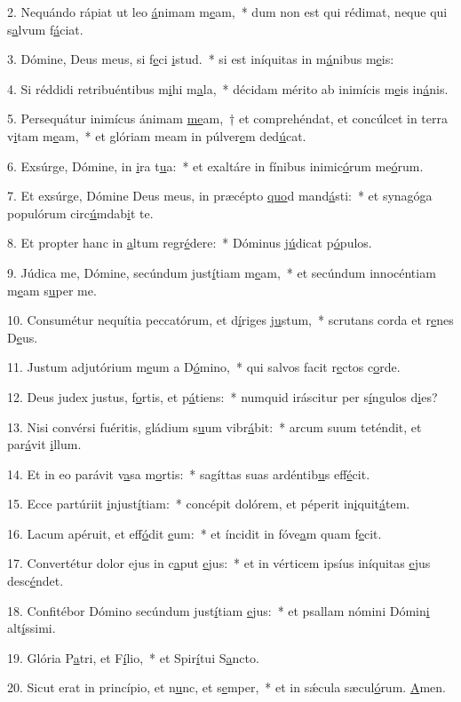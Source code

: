 2. Nequándo rápiat ut leo \uline{á}nimam m\uline{e}am,~* dum non est qui rédimat, neque qui s\uline{a}lvum f\uline{á}ciat.\par 
3. Dómine, Deus meus, si f\uline{e}ci \uline{i}stud.~* si est iníquitas in m\uline{á}nibus m\uline{e}is:\par 
4. Si réddidi retribuéntibus m\uline{i}hi m\uline{a}la,~* décidam mérito ab inimícis m\uline{e}is in\uline{á}nis.\par 
5. Persequátur inimícus ánimam \uline{me}am,~† et comprehéndat, et concúlcet in terra v\uline{i}tam m\uline{e}am,~* et glóriam meam in púlver\uline{e}m ded\uline{ú}cat.\par 
6. Exsúrge, Dómine, in \uline{i}ra t\uline{u}a:~* et exaltáre in fínibus inimic\uline{ó}rum me\uline{ó}rum.\par 
7. Et exsúrge, Dómine Deus meus, in præcépto \uline{quo}d mand\uline{á}sti:~* et synagóga populórum circ\uline{ú}mdab\uline{i}t te.\par 
8. Et propter hanc in \uline{a}ltum regr\uline{é}dere:~* Dóminus j\uline{ú}dicat p\uline{ó}pulos.\par 
9. Júdica me, Dómine, secúndum just\uline{í}tiam m\uline{e}am,~* et secúndum innocéntiam m\uline{e}am s\uline{u}per me.\par 
10. Consumétur nequítia peccatórum, et d\uline{í}riges j\uline{u}stum,~* scrutans corda et r\uline{e}nes D\uline{e}us.\par 
11. Justum adjutórium m\uline{e}um a D\uline{ó}mino,~* qui salvos facit r\uline{e}ctos c\uline{o}rde.\par 
12. Deus judex justus, f\uline{o}rtis, et p\uline{á}tiens:~* numquid iráscitur per s\uline{í}ngulos d\uline{i}es?\par 
13. Nisi convérsi fuéritis, gládium s\uline{u}um vibr\uline{á}bit:~* arcum suum teténdit, et par\uline{á}vit \uline{i}llum.\par 
14. Et in eo parávit v\uline{a}sa m\uline{o}rtis:~* sagíttas suas ardéntib\uline{u}s eff\uline{é}cit.\par 
15. Ecce partúriit \uline{i}njust\uline{í}tiam:~* concépit dolórem, et péperit in\uline{i}quit\uline{á}tem.\par 
16. Lacum apéruit, et eff\uline{ó}dit \uline{e}um:~* et íncidit in fóve\uline{a}m quam f\uline{e}cit.\par 
17. Convertétur dolor ejus in c\uline{a}put \uline{e}jus:~* et in vérticem ipsíus iníquitas \uline{e}jus desc\uline{é}ndet.\par 
18. Confitébor Dómino secúndum just\uline{í}tiam \uline{e}jus:~* et psallam nómini Dómin\uline{i} alt\uline{í}ssimi.\par 
19. Glória P\uline{a}tri, et F\uline{í}lio,~* et Spir\uline{í}tui S\uline{a}ncto.\par 
20. Sicut erat in princípio, et n\uline{u}nc, et s\uline{e}mper,~* et in sǽcula sæcul\uline{ó}rum. \uline{A}men.\par 
